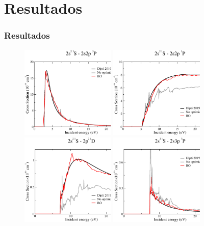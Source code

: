 \documentclass[14pt,compress]{beamer}
\begin{document}
\section{Resultados}
\begin{frame}
\frametitle{Resultados}

\vspace{-0.2cm}
\begin{figure}
\includegraphics[width=0.4\textwidth]{figures/rmatrix/sig001-002.eps}
\includegraphics[width=0.4\textwidth]{figures/rmatrix/sig001-003.eps} \\
\vspace{0.2cm}
\includegraphics[width=0.4\textwidth]{figures/rmatrix/sig001-006.eps} 
\includegraphics[width=0.4\textwidth]{figures/rmatrix/sig001-007.eps}
\end{figure}

\end{frame}
\end{document}
